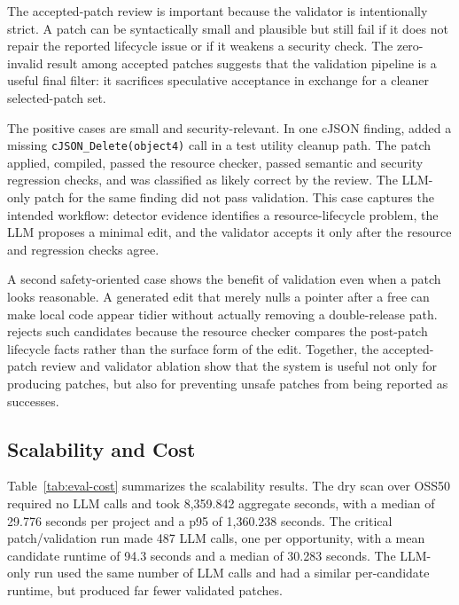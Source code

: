 The accepted-patch review is important because the validator is intentionally
strict. A patch can be syntactically small and plausible but still fail if it
does not repair the reported lifecycle issue or if it weakens a security check.
The zero-invalid result among accepted patches suggests that the validation
pipeline is a useful final filter: it sacrifices speculative acceptance in
exchange for a cleaner selected-patch set.

The positive cases are small and security-relevant. In one cJSON finding,
\SysName{} added a missing \texttt{cJSON\_Delete(object4)} call in a test utility
cleanup path. The patch applied, compiled, passed the resource checker, passed
semantic and security regression checks, and was classified as likely correct by
the review. The LLM-only patch for the same finding did not pass validation.
This case captures the intended workflow: detector evidence identifies a
resource-lifecycle problem, the LLM proposes a minimal edit, and the validator
accepts it only after the resource and regression checks agree.

A second safety-oriented case shows the benefit of validation even when a patch
looks reasonable. A generated edit that merely nulls a pointer after a free can
make local code appear tidier without actually removing a double-release path.
\SysName{} rejects such candidates because the resource checker compares the
post-patch lifecycle facts rather than the surface form of the edit. Together,
the accepted-patch review and validator ablation show that the system is useful
not only for producing patches, but also for preventing unsafe patches from
being reported as successes.

\subsection{Scalability and Cost}
\label{sec:evaluation-scalability}

Table~\ref{tab:eval-cost} summarizes the scalability results. The dry scan over
OSS50 required no LLM calls and took 8,359.842 aggregate seconds, with a median
of 29.776 seconds per project and a p95 of 1,360.238 seconds. The critical
\SysName{} patch/validation run made 487 LLM calls, one per opportunity, with a
mean candidate runtime of 94.3 seconds and a median of 30.283 seconds. The
LLM-only run used the same number of LLM calls and had a similar per-candidate
runtime, but produced far fewer validated patches.

